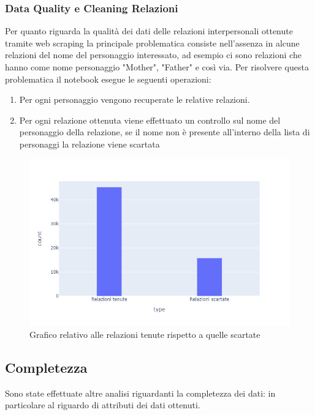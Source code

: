 \documentclass[
12pt, %
a4paper, %
oneside, %
headinclude,footinclude, %
BCOR5mm, %
]{scrartcl}
\begin{document}
\subsubsection{Data Quality e Cleaning Relazioni}
Per quanto riguarda la qualità dei dati delle relazioni interpersonali ottenute tramite web scraping la principale problematica consiste nell'assenza in alcune relazioni del nome del personaggio interessato, ad esempio ci sono relazioni che hanno come nome personaggio "Mother", "Father" e così via.
Per risolvere questa problematica il notebook esegue le seguenti operazioni:
\begin{enumerate}
	\item Per ogni personaggio vengono recuperate le relative relazioni.
	\item Per ogni relazione ottenuta viene effettuato un controllo sul nome del personaggio della relazione, se il nome non è presente all'interno della lista di personaggi la relazione viene scartata
\end{enumerate}
\begin{figure}[H]
  \includegraphics[scale=0.5]{plot_relazioni.png}
  \caption{Grafico relativo alle relazioni tenute rispetto a quelle scartate}
\end{figure}
\subsection{Completezza}
Sono state effettuate altre analisi riguardanti la completezza dei dati: in particolare al riguardo di attributi dei dati ottenuti.
\end{document}
